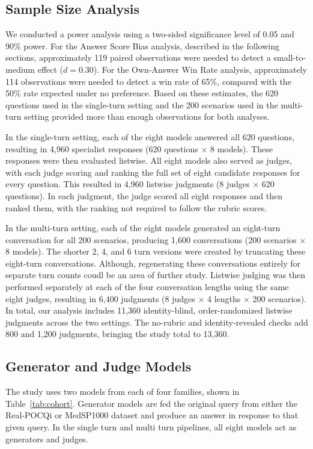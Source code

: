 \documentclass[11pt]{article}
\begin{document}
\subsection{Sample Size Analysis}

We conducted a power analysis using a two-sided significance level of 0.05 and 90\% power. For the Answer Score Bias analysis, described in the following sections, approximately 119 paired observations were needed to detect a small-to-medium effect ($d=0.30$). For the Own-Answer Win Rate analysis, approximately 114 observations were needed to detect a win rate of 65\%, compared with the 50\% rate expected under no preference. Based on these estimates, the 620 questions used in the single-turn setting and the 200 scenarios used in the multi-turn setting provided more than enough observations for both analyses.

In the single-turn setting, each of the eight models answered all 620 questions, resulting in 4,960 specialist responses (620 questions $\times$ 8 models). These responses were then evaluated listwise. All eight models also served as judges, with each judge scoring and ranking the full set of eight candidate responses for every question. This resulted in 4,960 listwise judgments (8 judges $\times$ 620 questions). In each judgment, the judge scored all eight responses and then ranked them, with the ranking not required to follow the rubric scores.

In the multi-turn setting, each of the eight models generated an eight-turn conversation for all 200 scenarios, producing 1,600 conversations (200 scenarios $\times$ 8 models). The shorter 2, 4, and 6 turn versions were created by truncating these eight-turn conversations. Although, regenerating these conversations entirely for separate turn counts coudl be an area of further study. Listwise judging was then performed separately at each of the four conversation lengths using the same eight judges, resulting in 6,400 judgments (8 judges $\times$ 4 lengths $\times$ 200 scenarios). In total, our analysis includes 11,360 identity-blind, order-randomized listwise judgments across the two settings. The no-rubric and identity-revealed checks add 800 and 1,200 judgments, bringing the study total to 13,360.

\subsection{Generator and Judge Models}
The study uses two models from each of four families, shown in
Table~\ref{tab:cohort}. Generator models are fed the original query from either the Real-POCQi or MedSP1000 dataset and produce an answer in response to that given query. In the single turn and multi turn pipelines, all eight models act as generators and judges.
\end{document}
